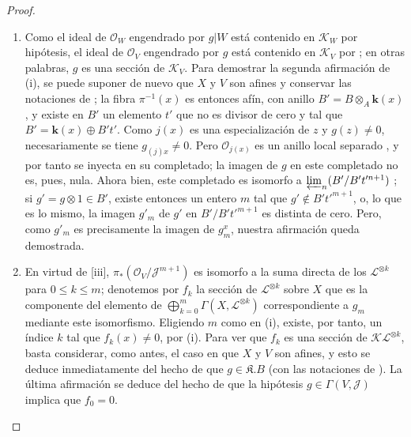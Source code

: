 \documentclass[oneside,10pt]{amsart}
\begin{document}
\begin{proof}
\begin{enumerate}
    \item[\rm{(i)}] Como el ideal de $\mathcal{O}_W$ engendrado por $g|W$ está contenido en $\mathcal{K}_W$ por hipótesis, el ideal de $\mathcal{O}_V$ engendrado por $g$ está contenido en $\mathcal{K}_V$ por ; en otras palabras, $g$ es una sección de $\mathcal{K}_V$.
        Para demostrar la segunda afirmación de (i), se puede suponer de nuevo que $X$ y $V$ son afines y conservar las notaciones de ;
        la fibra $\pi^{-1}(x)$ es entonces afín, con anillo $B'=B\otimes_A \boldsymbol{k}(x)$, y existe en $B'$ un elemento $t'$ que no es divisor de cero y tal que $B'=\boldsymbol{k}(x)\oplus B't'$.
        Como $j(x)$ es una especialización de $z$ y $g(z)\neq0$, necesariamente se tiene $g_{(j)x}\neq0$.
        Pero $\mathcal{O}_{j(x)}$ es un anillo local separado , y por tanto se inyecta en su completado; la imagen de $g$ en este completado no es, pues, nula.
        Ahora bien, este completado es isomorfo a $\varprojlim_n(B'/B't'^{n+1})$ ;
        si $g'=g\otimes1\in B'$, existe entonces un entero $m$ tal que $g'\notin B't'^{m+1}$, o, lo que es lo mismo, la imagen $g'_m$ de $g'$ en $B'/B't'^{m+1}$ es distinta de cero.
        Pero, como $g'_m$ es precisamente la imagen de $g_m^x$, nuestra afirmación queda demostrada.
    \item[\rm{(ii)}] En virtud de [iii], $\pi_*(\mathcal{O}_V/\mathcal{J}^{m+1})$ es isomorfo a la suma directa de los $\mathcal{L}^{\otimes k}$ para $0\leqslant k\leqslant m$;
        denotemos por $f_k$ la sección de $\mathcal{L}^{\otimes k}$ sobre $X$ que es la componente del elemento de $\bigoplus_{k=0}^m\Gamma(X,\mathcal{L}^{\otimes k})$ correspondiente a $g_m$ mediante este isomorfismo.
        Eligiendo $m$ como en (i), existe, por tanto, un índice $k$ tal que $f_k(x)\neq0$, por (i).
        Para ver que $f_k$ es una sección de $\mathcal{K}\mathcal{L}^{\otimes k}$, basta considerar, como antes, el caso en que $X$ y $V$ son afines, y esto se deduce inmediatamente del hecho de que $g\in\mathfrak{K}.B$ (con las notaciones de ).
        La última afirmación se deduce del hecho de que la hipótesis $g\in\Gamma(V,\mathcal{J})$ implica que $f_0=0$.
\end{enumerate}
\end{proof}
\end{document}
